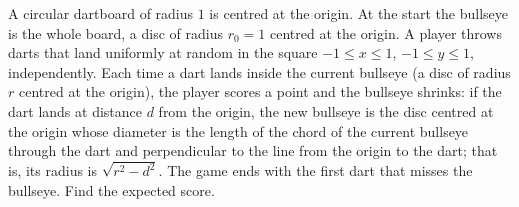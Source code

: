 A circular dartboard of radius $1$ is centred at the origin. At the start the bullseye is the whole board, a disc of radius $r_0=1$ centred at the origin. A player throws darts that land uniformly at random in the square $-1\le x\le1$, $-1\le y\le1$, independently. Each time a dart lands inside the current bullseye (a disc of radius $r$ centred at the origin), the player scores a point and the bullseye shrinks: if the dart lands at distance $d$ from the origin, the new bullseye is the disc centred at the origin whose diameter is the length of the chord of the current bullseye through the dart and perpendicular to the line from the origin to the dart; that is, its radius is $\sqrt{r^2-d^2}$. The game ends with the first dart that misses the bullseye. Find the expected score.
